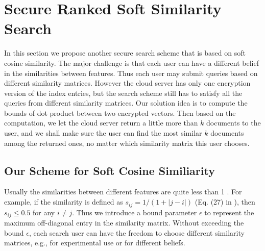 \documentclass{IEEEtran}
\begin{document}
\section{Secure Ranked Soft Similarity Search}
In this section we propose another secure search scheme that is based on soft cosine similarity. The major challenge is that each user can have a different belief in the similarities between features. Thus each user may submit queries based on different similarity matrices. However the cloud server has only one encryption version of the index entries, but the search scheme still has to satisfy all the queries from different similarity matrices. Our solution idea is to compute the bounds of dot product between two encrypted vectors. Then based on the computation, we let the cloud server return a little more than $k$ documents to the user, and we shall make sure the user can find the most similar $k$ documents among the returned ones, no matter which similarity matrix this user chooses.

\subsection{Our Scheme for Soft Cosine Similiarity}
Usually the similarities between different features are quite less than 1 \cite{Soft14}. For example, if the similarity is defined as $s_{ij} = 1/(1+|j-i|)$ (Eq. (27) in \cite{Soft14}), then $s_{ij}\leq 0.5$ for any $i \not= j$.
Thus we introduce a bound parameter $\epsilon$ to represent the maximum off-diagonal entry in the similarity matrix.
Without exceeding the bound $\epsilon$, each search user can have the freedom to choose different similarity matrices, e.g., for experimental use or for different beliefs.
\end{document}
